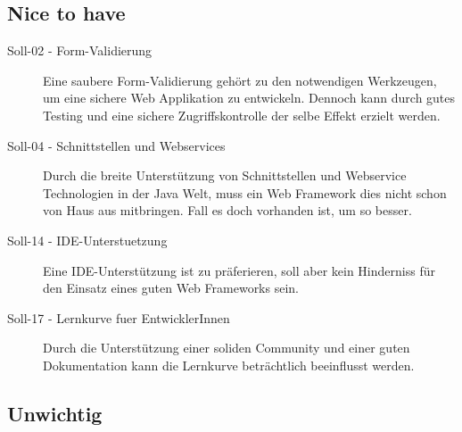   \subsection{Nice to have}
  
  \begin{description}
  \item[Soll-02 - Form-Validierung]
  Eine saubere Form-Validierung gehört zu den notwendigen Werkzeugen, um eine
  sichere Web Applikation zu entwickeln. Dennoch kann durch gutes Testing und
  eine sichere Zugriffskontrolle der selbe Effekt erzielt werden.
  
  \item[Soll-04 - Schnittstellen und Webservices]
  Durch die breite Unterstützung von Schnittstellen und Webservice Technologien
  in der Java Welt, muss ein Web Framework dies nicht schon von Haus aus
  mitbringen. Fall es doch vorhanden ist, um so besser.
  
  \item[Soll-14 - IDE-Unterstuetzung]
  Eine IDE-Unterstützung ist zu präferieren, soll aber kein Hinderniss für den
  Einsatz eines guten Web Frameworks sein.
  
  \item[Soll-17 - Lernkurve fuer EntwicklerInnen]
  Durch die Unterstützung einer soliden Community und einer guten Dokumentation
  kann die Lernkurve beträchtlich beeinflusst werden.
  
  \end{description}
  
  \subsection{Unwichtig}
  
